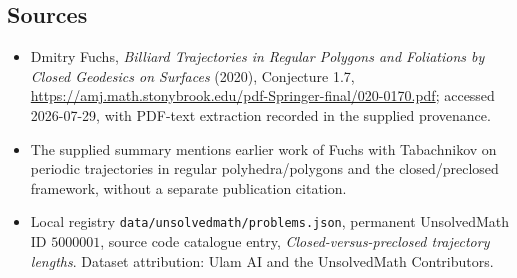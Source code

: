 \documentclass[11pt]{article}
\begin{document}
\subsection{Sources}
\begin{itemize}
\item Dmitry Fuchs, \emph{Billiard Trajectories in Regular Polygons and Foliations by Closed Geodesics on Surfaces} (2020), Conjecture 1.7, \url{https://amj.math.stonybrook.edu/pdf-Springer-final/020-0170.pdf}; accessed 2026-07-29, with PDF-text extraction recorded in the supplied provenance.
\item The supplied summary mentions earlier work of Fuchs with Tabachnikov on periodic trajectories in regular polyhedra/polygons and the closed/preclosed framework, without a separate publication citation.
\item Local registry \texttt{data/unsolvedmath/problems.json}, permanent UnsolvedMath ID $5000001$, source code catalogue entry, \emph{Closed-versus-preclosed trajectory lengths}. Dataset attribution: Ulam AI and the UnsolvedMath Contributors.
\end{itemize}
\end{document}
